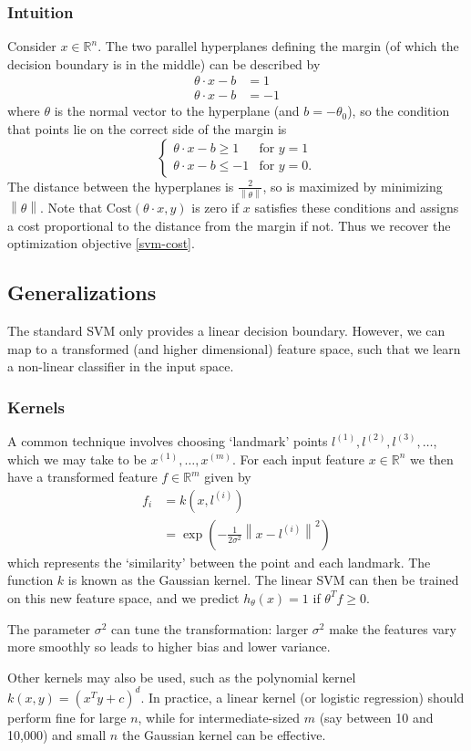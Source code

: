 \documentclass[a4paper,12pt]{article}
\theoremstyle{definition}
\newcommand{\R}{\mathbb{R}}
\newcommand{\norm}[1]{\left\lVert#1\right\rVert}
\begin{document}
\subsubsection{Intuition}
Consider $x \in \R^{n}$. The two parallel hyperplanes defining the margin (of which the decision boundary is in the middle) can be described by
\begin{align*}
\theta \cdot x - b &= 1 \\
\theta \cdot x - b &= -1
\end{align*}
where $\theta$ is the normal vector to the hyperplane (and $b = -\theta_0$), so the condition that points lie on the correct side of the margin is
\[
\begin{cases}
\theta \cdot x - b \ge 1 & \text{for } y = 1 \\
\theta \cdot x - b \le -1 & \text{for } y = 0.
\end{cases}
\]
The distance between the hyperplanes is $\frac{2}{\norm{\theta}}$, so is maximized by minimizing $\norm{\theta}$. Note that $\mathrm{Cost}(\theta \cdot x, y)$ is zero if $x$ satisfies these conditions and assigns a cost proportional to the distance from the margin if not. Thus we recover the optimization objective \eqref{svm-cost}.

\subsection{Generalizations}
The standard SVM only provides a linear decision boundary. However, we can map to a transformed (and higher dimensional) feature space, such that we learn a non-linear classifier in the input space. 

\subsubsection{Kernels}
A common technique involves choosing `landmark' points $l^{(1)}, l^{(2)}, l^{(3)}, \ldots$, which we may take to be $x^{(1)}, \ldots, x^{(m)}$. For each input feature $x \in \R^n$ we then have a transformed feature $f \in \R^m$ given by
\begin{align*}
f_i &= k(x, l^{(i)}) \\
&= \exp{\left( - \frac{1}{2 \sigma^2} \norm{x - l^{(i)}}^2 \right)}
\end{align*}
which represents the `similarity' between the point and each landmark. The function $k$ is known as the Gaussian kernel. The linear SVM can then be trained on this new feature space, and we predict $h_{\theta}(x) = 1$ if $\theta^T f \ge 0$.

The parameter $\sigma^2$ can tune the transformation: larger $\sigma^2$ make the features vary more smoothly so leads to higher bias and lower variance.

Other kernels may also be used, such as the polynomial kernel $k(x, y) = (x^T y + c)^d$. In practice, a linear kernel (or logistic regression) should perform fine for large $n$, while for intermediate-sized $m$ (say between 10 and 10,000) and small $n$ the Gaussian kernel can be effective.
\end{document}
